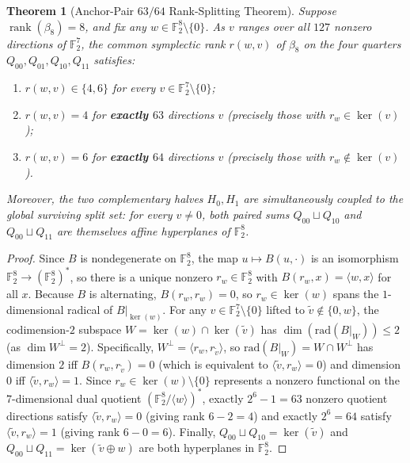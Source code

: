 \documentclass[11pt]{article}
\newtheorem{theorem}{Theorem}[section]
\theoremstyle{definition}
\newcommand{\F}{\mathbb{F}}
\newcommand{\rank}{\operatorname{rank}}
\begin{document}
\begin{theorem}[Anchor-Pair $63/64$ Rank-Splitting Theorem]
\label{thm:anchor6364}
Suppose $\rank(\beta_8) = 8$, and fix any $w \in \F_2^8 \setminus \{0\}$.
As $v$ ranges over all $127$ nonzero directions of $\F_2^7$, the common symplectic rank $r(w, v)$ of $\beta_8$ on the four quarters $Q_{00}, Q_{01}, Q_{10}, Q_{11}$ satisfies:
\begin{enumerate}[nosep]
  \item $r(w, v) \in \{4, 6\}$ for every $v \in \F_2^7 \setminus \{0\}$;
  \item $r(w, v) = 4$ for \textbf{exactly $63$} directions $v$ (precisely those with $r_w \in \ker(v)$);
  \item $r(w, v) = 6$ for \textbf{exactly $64$} directions $v$ (precisely those with $r_w \notin \ker(v)$).
\end{enumerate}
Moreover, the two complementary halves $H_0, H_1$ are simultaneously coupled to the global surviving split set: for every $v \neq 0$, both paired sums $Q_{00} \sqcup Q_{10}$ and $Q_{00} \sqcup Q_{11}$ are themselves affine hyperplanes of $\F_2^8$.
\end{theorem}
\begin{proof}
Since $B$ is nondegenerate on $\F_2^8$, the map $u \mapsto B(u, \cdot)$ is an isomorphism $\F_2^8 \to (\F_2^8)^*$, so there is a unique nonzero $r_w \in \F_2^8$ with $B(r_w, x) = \langle w, x \rangle$ for all $x$.
Because $B$ is alternating, $B(r_w, r_w) = 0$, so $r_w \in \ker(w)$ spans the $1$-dimensional radical of $B|_{\ker(w)}$.
For any $v \in \F_2^7 \setminus \{0\}$ lifted to $\tilde{v} \notin \{0, w\}$, the codimension-$2$ subspace $W = \ker(w) \cap \ker(\tilde{v})$ has $\dim(\mathrm{rad}(B|_W)) \le 2$ (as $\dim W^\perp = 2$).
Specifically, $W^\perp = \langle r_w, r_{\tilde{v}} \rangle$, so $\mathrm{rad}(B|_W) = W \cap W^\perp$ has dimension $2$ iff $B(r_w, r_{\tilde{v}}) = 0$ (which is equivalent to $\langle \tilde{v}, r_w \rangle = 0$) and dimension $0$ iff $\langle \tilde{v}, r_w \rangle = 1$.
Since $r_w \in \ker(w) \setminus \{0\}$ represents a nonzero functional on the $7$-dimensional dual quotient $(\F_2^8 / \langle w \rangle)^*$, exactly $2^6 - 1 = 63$ nonzero quotient directions satisfy $\langle \tilde{v}, r_w \rangle = 0$ (giving rank $6 - 2 = 4$) and exactly $2^6 = 64$ satisfy $\langle \tilde{v}, r_w \rangle = 1$ (giving rank $6 - 0 = 6$).
Finally, $Q_{00} \sqcup Q_{10} = \ker(\tilde{v})$ and $Q_{00} \sqcup Q_{11} = \ker(\tilde{v} \oplus w)$ are both hyperplanes in $\F_2^8$.
\end{proof}
\end{document}
